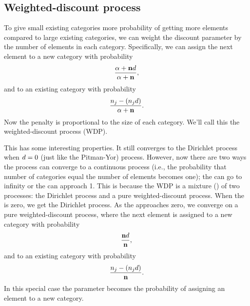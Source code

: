 \subsection{Weighted-discount process}

To give small existing categories more probability of getting more elements
compared to large existing categories, we can weight the discount parameter
by the number of elements in each category. Specifically, 
we can assign the next element to a new category with probability
\begin{equation}
    \frac{\concentration + \numassignedtotal\discount}{\concentration + \numassignedtotal},
    \label{eq:wdprobnew}
\end{equation}
and to an existing category with probability
\begin{equation}
    \frac{\numassigned[\catindex] - (\numassigned[\catindex]\discount)}{\concentration + \numassignedtotal}.
    \label{eq:wdprobexisting}
\end{equation}
Now the penalty is proportional to the size of each category.
We'll call this the weighted-discount process (WDP).

This has some interesting properties.
It still converges to the Dirichlet process when $d = 0$ (just like the
Pitman-Yor) process.
However, now there are two ways the process can converge to a continuous
process (i.e., the probability that number of categories equal the number of
elements becomes one); the \concentration can go to infinity or the
\discount can approach 1.
This is because the WDP is a mixture () of two processes: the Dirichlet process and a
pure weighted-discount process.
When the \discount is zero, we get the Dirichlet process.
As the \concentration approaches zero, we converge on a pure
weighted-discount process, where the next element is assigned to
a new category with probability
\begin{equation}
    \frac{\numassignedtotal\discount}{\numassignedtotal},
    \label{eq:pwdprobnew}
\end{equation}
and to an existing category with probability
\begin{equation}
    \frac{\numassigned[\catindex] - (\numassigned[\catindex]\discount)}{\numassignedtotal}.
    \label{eq:pwdprobexisting}
\end{equation}
In this special case the \discount parameter becomes the probability of
assigning an element to a new category.


